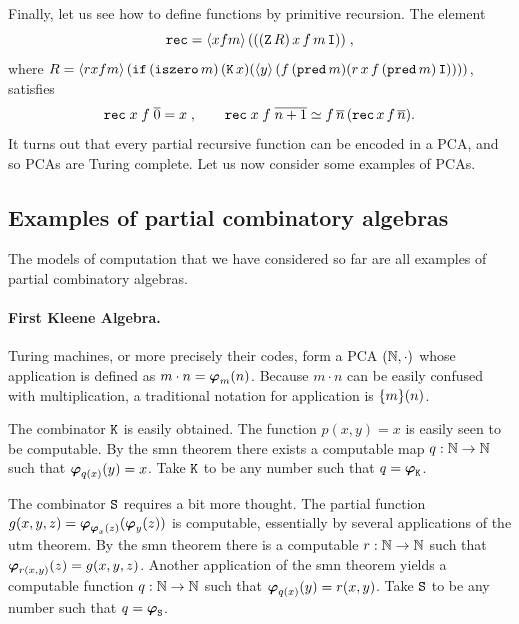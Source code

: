 Finally, let us see how to define functions by primitive recursion.
%
%
%
The element
%
\begin{equation*}
  \mathtt{rec} = \langle x f m \rangle\,(((\mathtt{Z}\, R)\, x\, f\, m\, \mathtt{I})) \;,
\end{equation*}
%
where $R = \langle r x f m \rangle\,(\mathtt{if}\, (\mathtt{iszero}\, m)\, (\mathtt{K}\, x)
  (\langle y \rangle\,(f\, (\mathtt{pred}\, m)(r\, x\, f\, (\mathtt{pred}\, m)\,
    \mathtt{I}))))$, satisfies
%
\begin{equation*}
  \mathtt{rec}\; x\; f\; \overline{0} = x \;,\qquad
  \mathtt{rec}\; x\; f\; \overline{n+1} \simeq
    f\, \overline{n}\, (\mathtt{rec}\, x\, f\, \overline{n}).
\end{equation*}
%
It turns out that every partial recursive function can be encoded in a
PCA, and so PCAs are Turing complete. Let us now consider some
examples of PCAs.

\subsection{Examples of partial combinatory algebras}
\label{sec:pca-examples}

The models of computation that we have considered so far are all
examples of partial combinatory algebras.

\paragraph{First Kleene Algebra.}

Turing machines, or more precisely their codes, form a PCA $(\mathbb{N},
{\cdot})$ whose application is defined as $m \cdot n = \text{\boldmath{$\varphi$}}_{m}(n)$.
Because $m \cdot n$ can be easily confused with multiplication, a
traditional notation for application is $\{m\}(n)$. 

The combinator $\mathtt{K}$ is easily obtained. The function $p(x,y) = x$
is easily seen to be computable. By the smn theorem there exists a
computable map $q : \mathbb{N} \to \mathbb{N}$ such that $\text{\boldmath{$\varphi$}}_{q(x)}(y) = x$. Take
$\mathtt{K}$ to be any number such that $q = \text{\boldmath{$\varphi$}}_{\mathtt{K}}$.

The combinator $\mathtt{S}$ requires a bit more thought. The partial
function $g(x,y,z) = \text{\boldmath{$\varphi$}}_{\text{\boldmath{$\varphi$}}_{x}(z)}(\text{\boldmath{$\varphi$}}_{y}(z))$ is computable,
essentially by several applications of the utm theorem. By the smn
theorem there is a computable $r : \mathbb{N} \to \mathbb{N}$ such that
$\text{\boldmath{$\varphi$}}_{r(x,y)}(z) = g(x,y,z)$. Another application of the smn theorem
yields a computable function $q : \mathbb{N} \to \mathbb{N}$ such that $\text{\boldmath{$\varphi$}}_{q(x)}(y)
= r(x,y)$. Take $\mathtt{S}$ to be any number such that $q = \text{\boldmath{$\varphi$}}_{\mathtt{S}}$.

